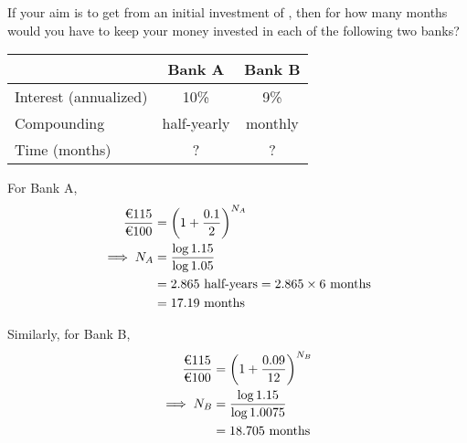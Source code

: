 

\question[3]  If your aim is to get  from an initial investment
of , then for how many months would you have to keep
your money invested in each of the following two banks?
	\begin{tabular}{lcc}
		\toprule
		& Bank A & Bank B \\
		\midrule
		Interest (annualized) & 10\% & 9\% \\
		Compounding & half-yearly & monthly \\
		Time (months) & ? & ? \\
		\bottomrule
	\end{tabular}


\ifprintanswers
\fi 

\begin{solution}[\fullpage]
	For Bank A,
	\begin{align}
		\dfrac{\text{\texteuro 115}}{\text{\texteuro 100}} &= \left(1+\dfrac{0.1}{2}\right)^{N_A} \\
		\implies N_A &= \dfrac{\log 1.15}{\log 1.05} \\
		                &= 2.865\text{ half-years} = 2.865\times\text{6 months} \\
		                &= 17.19\text{ months}
	\end{align}
	
	Similarly, for Bank B,
	\begin{align}
		\dfrac{\text{\texteuro 115}}{\text{\texteuro 100}} &= \left(1+\dfrac{0.09}{12}\right)^{N_B} \\
		\implies N_B &= \dfrac{\log 1.15}{\log 1.0075} \\
		                &= 18.705\text{ months}
	\end{align}
	
	
\end{solution}
\ifprintanswers\begin{codex}\end{codex}\fi
